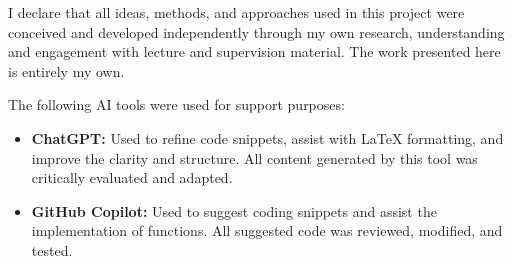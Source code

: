 \documentclass[a4paper,12pt]{article}
\begin{document}
I declare that all ideas, methods, and approaches used in this project were conceived and developed independently through my own research, understanding and engagement with lecture and supervision material. The work presented here is entirely my own.

The following AI tools were used for support purposes:
\begin{itemize}
    \item \textbf{ChatGPT:} Used to refine code snippets, assist with LaTeX formatting, and improve the clarity and structure. All content generated by this tool was critically evaluated and adapted.
    \item \textbf{GitHub Copilot:} Used to suggest coding snippets and assist the implementation of functions. All suggested code was reviewed, modified, and tested.
\end{itemize}
\end{document}
